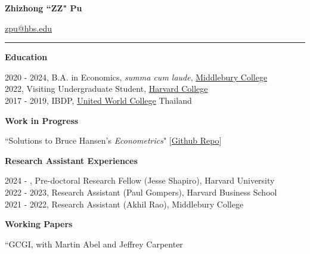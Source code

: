 \documentclass{article}
\begin{document}
{\Large \textbf{Zhizhong ``ZZ" Pu}\par}
    \href{mailto:zpu@hbs.edu}{zpu@hbs.edu} \href{https://github.com/zhizhongpu}{\faGithub} \hspace{0.2em} \\
    \vspace{-0.1in}
    \rule{\textwidth}{1pt}
    \vspace{0in}

{\Large \textbf{Education}}\\
    \vspace{-0.15in}
	\begin{adjustwidth}{1.5em}{0pt}
        2020 - 2024, B.A. in Economics, \textit{summa cum laude}, \href{http://www.middlebury.edu/}{Middlebury College}\\
        2022, Visiting Undergraduate Student, \href{http://www.harvard.edu/}{Harvard College}\\
        2017 - 2019, IBDP, \href{https://www.uwc.org/about}{United World College} Thailand
    \end{adjustwidth}
    \vspace{0.1in}


{\Large \textbf{Work in Progress}}\\
    \vspace{-0.15in}
	\begin{adjustwidth}{1.5em}{0pt}     
        ``Solutions to Bruce Hansen's \textit{Econometrics}" [\href{https://github.com/zhizhongpu/solutions_econometrics_hansen}{Github Repo}]
    \end{adjustwidth}
    \vspace{0.1in}
	
{\Large \textbf{Research Assistant Experiences}}
\begin{adjustwidth}{1.5em}{0pt}
    2024 - , Pre-doctoral Research Fellow (Jesse Shapiro), Harvard University \\
    2022 - 2023, Research Assistant (Paul Gompers), Harvard Business School \\
    2021 - 2022, Research Assistant (Akhil Rao), Middlebury College
\end{adjustwidth}
\vspace{0.1in}


{\Large \textbf{Working Papers}}\\
    \vspace{-0.15in}
	\begin{adjustwidth}{1.5em}{0pt}
     ``GCGI, with Martin Abel and Jeffrey Carpenter
    \end{adjustwidth}
	\vspace{0.1in}
\end{document}

